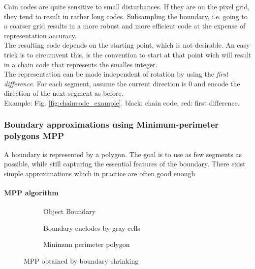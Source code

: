 Cain codes are quite sensitive to small disturbances. If they are on the pixel grid, they tend to result in rather long codes. Subsampling the boundary, i.e. going to a coarser grid results in a more robust and more efficient code at the expense of representation accuracy.\\
The resulting code depends on the starting point, which is not desirable. An easy trick is to circumvent this, is the convention to start at that point wich will result in a chain code that represents the smalles integer.\\

The representation can be made independent of rotation by using the \emph{first difference}.
For each segment, assume the current direction is 0 and encode the direction of the next segment as before. \\
Example: Fig. \ref{fig:chaincode_example}. black: chain code, red: first difference.

\subsubsection{Boundary approximations using Minimum-perimeter polygons MPP}
A boundary is represented by a polygon. The goal is to use as few segments as possible, while still capturing the essential features of the boundary. There exist simple approximations which in practice are often good enough\\
\paragraph{MPP algorithm}
\begin{figure}[h]
	\centering
	\begin{subfigure}[b]{0.3\textwidth}
		\centering
		\caption{Object Boundary}
	\end{subfigure}
	\begin{subfigure}[b]{0.3\textwidth}
		\centering
		\caption{Boundary enclodes by gray cells}
	\end{subfigure}
	\begin{subfigure}[b]{0.3\textwidth}
		\centering
		\caption{Minimum perimeter polygon}
	\end{subfigure}
	\caption{MPP obtained by boundary shrinking}
\end{figure}

